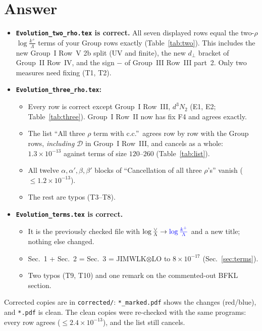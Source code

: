 \documentclass[10pt]{article}
\numberwithin{equation}{section}
\newcommand{\new}[1]{{\color{blue}#1}}
\begin{document}
\section{Answer}
\begin{itemize}
\item \textbf{\texttt{Evolution\_two\_rho.tex} is correct.} All seven displayed rows equal the two-$\rho$ $\log\frac{k^+}{\Lambda}$ terms of your Group rows exactly (Table~\ref{tab:two}). This includes the new Group~I Row~V 2b split (UV and finite), the new $d_\perp$ bracket of Group~II Row~IV, and the sign $-$ of Group~III Row~III part~2. Only two measures need fixing (T1, T2).
\item \textbf{\texttt{Evolution\_three\_rho.tex}:}
  \begin{itemize}
  \item Every row is correct except Group~I Row~III, $d^3N_2$ (E1, E2; Table~\ref{tab:three}). Group~I Row~II now has fix F4 and agrees exactly.
  \item The list ``All three $\rho$ term with c.c.''\ agrees row by row with the Group rows, \emph{including} $\mathcal D$ in Group~I Row~III, and cancels as a whole: $1.3\times10^{-13}$ against terms of size $120$--$260$ (Table~\ref{tab:list}).
  \item All twelve $\alpha,\alpha',\beta,\beta'$ blocks of ``Cancellation of all three $\rho$'s'' vanish ($\le1.2\times10^{-13}$).
  \item The rest are typos (T3--T8).
  \end{itemize}
\item \textbf{\texttt{Evolution\_terms.tex} is correct.}
  \begin{itemize}
  \item It is the previously checked file with $\log\frac{\vee}{\Lambda}\to\new{\log\frac{k^+}{\Lambda}}$ and a new title; nothing else changed.
  \item Sec.~1 + Sec.~2 = Sec.~3 = JIMWLK$\otimes$LO to $8\times10^{-17}$ (Sec.~\ref{sec:terms}).
  \item Two typos (T9, T10) and one remark on the commented-out BFKL section.
  \end{itemize}
\end{itemize}
Corrected copies are in \texttt{corrected/}: \texttt{*\_marked.pdf} shows the changes (red/blue), and \texttt{*.pdf} is clean. The clean copies were re-checked with the same programs: every row agrees ($\le 2.4\times10^{-13}$), and the list still cancels.
\end{document}
